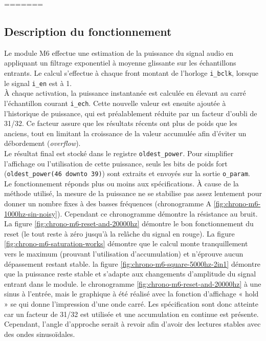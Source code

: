 =======


\subsection{Description du fonctionnement}

Le module M6 effectue une estimation de la puissance du signal audio en
appliquant un filtrage exponentiel à moyenne glissante sur les échantillons
entrants. Le calcul s'effectue à chaque front montant de l'horloge
\verb|i_bclk|, lorsque le signal \verb|i_en| est à 1. \\

À chaque activation, la puissance instantanée est calculée en élevant au
carré l'échantillon courant \verb|i_ech|. Cette nouvelle valeur est ensuite
ajoutée à l'historique de puissance, qui est préalablement réduite par un
facteur d'oubli de 31/32. Ce facteur assure que les résultats récents ont
plus de poids que les anciens, tout en limitant la croissance de la valeur
accumulée afin d'éviter un débordement (\emph{overflow}). \\

Le résultat final est stocké dans le registre \verb|oldest_power|. Pour
simplifier l'affichage ou l'utilisation de cette puissance, seuls les bits de
poids fort (\verb|oldest_power(46 downto 39)|) sont extraits et envoyés sur
la sortie \verb|o_param|. \\

Le fonctionnement réponds plus ou moins aux spécifications.
À cause de la méthode utilisé, la mesure de la puissance ne se stabilise pas assez lentement pour donner un nombre fixes
à des basses fréquences (chronogramme A \ref{fig:chrono-m6-1000hz-sin-noisy}). Cependant ce chronogramme démontre la résistance au bruit.
La figure \ref{fig:chrono-m6-reset-and-20000hz} démontre le bon fonctionnement du reset (le tout reste à zéro jusqu’à la relâche du signal en rouge).
La figure \ref{fig:chrono-m6-saturation-works} démontre que le calcul monte tranquillement vers le maximum (prouvant l'utilisation d'accumulation)
et n'éprouve aucun dépassement restant stable. la figure \ref{fig:chrono-m6-square-5000hz-2in1} démontre que la puissance reste stable et s'adapte
aux changements d'amplitude du signal entrant dans le module. le chronogramme \ref{fig:chrono-m6-reset-and-20000hz} à une sinus à l'entrée, mais le graphique
à été réalisé avec la fonction d'affichage « hold » se qui donne l'impression d'une onde carré. Les spécification sont
donc atteinte car un facteur de 31/32 est utilisée et une accumulation en continue est présente. Cependant, l'angle d'approche
serait à revoir afin d'avoir des lectures stables avec des ondes sinusoïdales.

